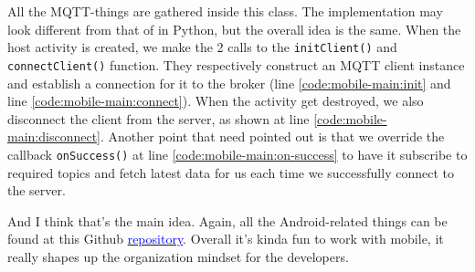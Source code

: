 All the MQTT-things are gathered inside this class. The implementation may look different from that of in Python, but the overall idea is the same. When the host activity is created, we make the 2 calls to the \texttt{initClient()} and \texttt{connectClient()} function. They respectively construct an MQTT client instance and establish a connection for it to the broker (line \ref{code:mobile-main:init} and line \ref{code:mobile-main:connect}). When the activity get destroyed, we also disconnect the client from the server, as shown at line \ref{code:mobile-main:disconnect}. Another point that need pointed out is that we override the callback \texttt{onSuccess()} at line \ref{code:mobile-main:on-success} to have it subscribe to required topics and fetch latest data for us each time we successfully connect to the server.

And I think that's the main idea. Again, all the Android-related things can be found at this Github \href{https://github.com/hescul/adafruit-simple-iot}{\textcolor{blue}{repository}}. Overall it's kinda fun to work with mobile, it really shapes up the organization mindset for the developers.
\clearpage